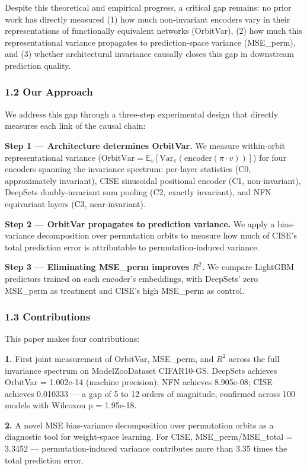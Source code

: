 Despite this theoretical and empirical progress, a critical gap remains: no prior work has directly measured (1) how much non-invariant encoders vary in their representations of functionally equivalent networks (OrbitVar), (2) how much this representational variance propagates to prediction-space variance (MSE\_perm), and (3) whether architectural invariance causally closes this gap in downstream prediction quality.

\subsubsection{1.2 Our Approach}

We address this gap through a three-step experimental design that directly measures each link of the causal chain:

\textbf{Step 1 --- Architecture determines OrbitVar.} We measure within-orbit representational variance ($\text{OrbitVar} = \mathbb{E}_v[\text{Var}_{\pi}(\text{encoder}(\pi \cdot v))]$) for four encoders spanning the invariance spectrum: per-layer statistics (C0, approximately invariant), CISE sinusoidal positional encoder (C1, non-invariant), DeepSets doubly-invariant sum pooling (C2, exactly invariant), and NFN equivariant layers (C3, near-invariant).

\textbf{Step 2 --- OrbitVar propagates to prediction variance.} We apply a bias-variance decomposition over permutation orbits to measure how much of CISE's total prediction error is attributable to permutation-induced variance.

\textbf{Step 3 --- Eliminating MSE\_perm improves $R^2$.} We compare LightGBM predictors trained on each encoder's embeddings, with DeepSets' zero MSE\_perm as treatment and CISE's high MSE\_perm as control.

\subsubsection{1.3 Contributions}

This paper makes four contributions:

\textbf{1.} First joint measurement of OrbitVar, MSE\_perm, and $R^2$ across the full invariance spectrum on ModelZooDataset CIFAR10-GS. DeepSets achieves OrbitVar = 1.002e-14 (machine precision); NFN achieves 8.905e-08; CISE achieves 0.010333 --- a gap of 5 to 12 orders of magnitude, confirmed across 100 models with Wilcoxon p = 1.95e-18.

\textbf{2.} A novel MSE bias-variance decomposition over permutation orbits as a diagnostic tool for weight-space learning. For CISE, MSE\_perm/MSE\_total = 3.3452 --- permutation-induced variance contributes more than 3.35 times the total prediction error.

